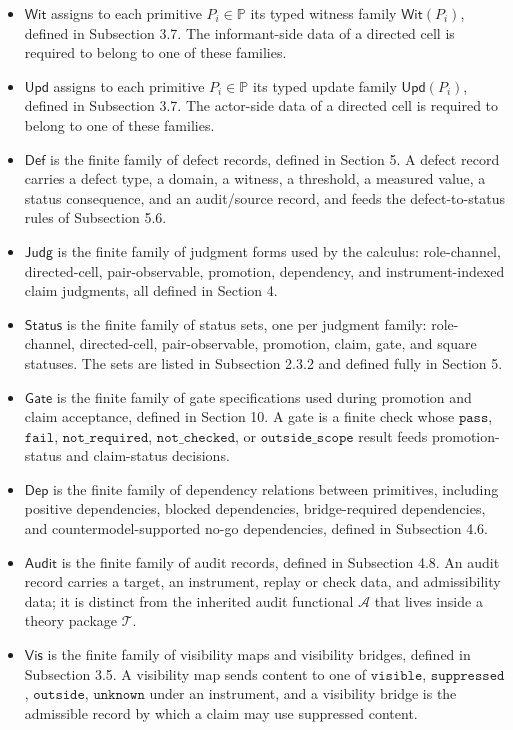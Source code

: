 \documentclass[11pt]{article}
\theoremstyle{definition}
\begin{document}
\begin{itemize}
\item
  \(\mathsf{Wit}\) assigns to each primitive \(P_i\in\mathbb P\) its typed witness family \(\mathsf{Wit}(P_i)\), defined in Subsection 3.7. The informant-side data of a directed cell is required to belong to one of these families.
\item
  \(\mathsf{Upd}\) assigns to each primitive \(P_i\in\mathbb P\) its typed update family \(\mathsf{Upd}(P_i)\), defined in Subsection 3.7. The actor-side data of a directed cell is required to belong to one of these families.
\item
  \(\mathsf{Def}\) is the finite family of defect records, defined in Section 5. A defect record carries a defect type, a domain, a witness, a threshold, a measured value, a status consequence, and an audit/source record, and feeds the defect-to-status rules of Subsection 5.6.
\item
  \(\mathsf{Judg}\) is the finite family of judgment forms used by the calculus: role-channel, directed-cell, pair-observable, promotion, dependency, and instrument-indexed claim judgments, all defined in Section 4.
\item
  \(\mathsf{Status}\) is the finite family of status sets, one per judgment family: role-channel, directed-cell, pair-observable, promotion, claim, gate, and square statuses. The sets are listed in Subsection 2.3.2 and defined fully in Section 5.
\item
  \(\mathsf{Gate}\) is the finite family of gate specifications used during promotion and claim acceptance, defined in Section 10. A gate is a finite check whose \(\texttt{pass}\), \(\texttt{fail}\), \(\texttt{not\_required}\), \(\texttt{not\_checked}\), or \(\texttt{outside\_scope}\) result feeds promotion-status and claim-status decisions.
\item
  \(\mathsf{Dep}\) is the finite family of dependency relations between primitives, including positive dependencies, blocked dependencies, bridge-required dependencies, and countermodel-supported no-go dependencies, defined in Subsection 4.6.
\item
  \(\mathsf{Audit}\) is the finite family of audit records, defined in Subsection 4.8. An audit record carries a target, an instrument, replay or check data, and admissibility data; it is distinct from the inherited audit functional \(\mathcal A\) that lives inside a theory package \(\mathcal T\).
\item
  \(\mathsf{Vis}\) is the finite family of visibility maps and visibility bridges, defined in Subsection 3.5. A visibility map sends content to one of \(\texttt{visible}\), \(\texttt{suppressed}\), \(\texttt{outside}\), \(\texttt{unknown}\) under an instrument, and a visibility bridge is the admissible record by which a claim may use suppressed content.

\end{itemize}
\end{document}
